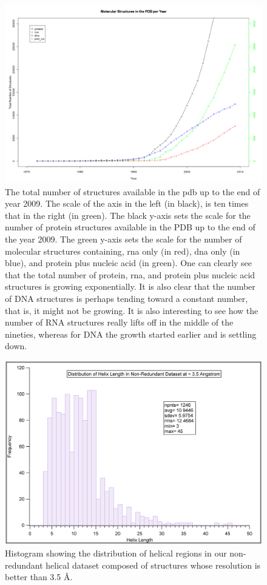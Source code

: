 \begin{figure}
\centering
\includegraphics[angle=90, scale=0.5]{Supplement/allmolecules_per_year.png}
\caption{The total number of structures available in the pdb up to the
end of year 2009. The scale of the axis in the left (in black), is ten
times that in the right (in green). The black y-axis sets the scale
for the number of protein structures available in the PDB up to the
end of the year 2009. The green y-axis sets the scale for the number
of molecular structures containing, rna only (in red), dna only (in
blue), and protein plus nucleic acid (in green).
One can clearly see that the total number of protein, rna, and protein
plus nucleic acid structures is growing exponentially. It is also
clear that the number of DNA structures is perhaps tending toward a
constant number, that is, it might not be growing. It is also
interesting to see how the number of RNA structures really lifts off in the
middle of the nineties, whereas for DNA the growth started earlier and
is settling down.}
\label{fig:allpolypdb}
\end{figure}

\begin{figure}
\centering
\includegraphics[angle=0, scale=0.5]{Supplement/heldistrib.png}
\caption{Histogram showing the distribution of helical regions in our
  non-redundant helical dataset composed of structures whose
  resolution is better than 3.5 \AA.}
\label{fig:hellength}
\end{figure}





